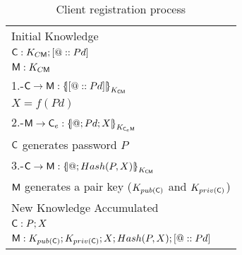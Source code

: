\begin{table}[htb]
\footnotesize
\begin{center}
\caption{Client registration process}
\label{table:reqSessKey}
\begin{tabular}{|l|}
\hline
Initial Knowledge                                                             \\
$\textsf{C}:K_{C\textsf{M}}; [@::Pd]$                                                    \\
$\textsf{M}: K_{C\textsf{M}}$                                                            \\ \hline \hline
1.-$\Client\rightarrow \Server:\fat{[@::Pd]}_{K_{\Client\Server}}$                     \\
\hspace{5mm} $X=f(Pd) $                           \\ 
2.-$\Server\rightarrow \Client_e: \fat{@\lnk Pd \lnk X}_{K_{\Client_e\Server}} $                  \\ 
\hspace{5mm} $\textsf{C}$ generates password $P$                          \\  
3.-$\Client\rightarrow \Server:\fat{@\lnk Hash(P,X)}_{K_{\Client\Server}}$                 \\  
\hspace{5mm} $\textsf{M}$ generates a pair key ($K_{pub(\textsf{C})}$ and $K_{priv(\textsf{C})}$)\\\hline  
New Knowledge Accumulated                                                     \\
$\textsf{C}:P; X$                                                                \\
$\textsf{M}: K_{pub(\textsf{C})}; K_{priv(\textsf{C})}; X ; Hash(P,X); [@::Pd]$       \\\hline \hline 
\end{tabular}
\end{center}
\end{table}
\normalsize

